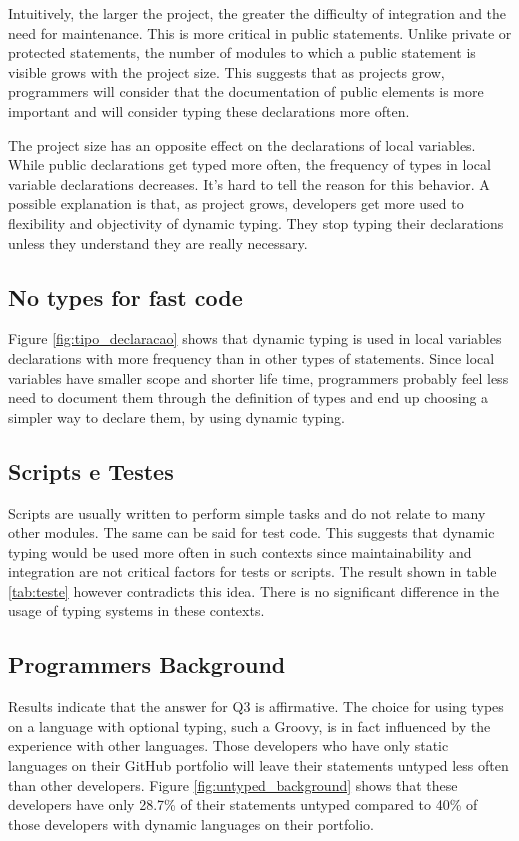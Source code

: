 \documentclass[preprint]{sigplanconf}
\begin{document}
Intuitively, the larger the project, the greater the difficulty of integration and the need for maintenance.
This is more critical in public statements.
Unlike private or protected statements, the number of modules to which a public statement is visible grows with the project size.
This suggests that as projects grow, programmers will consider that the documentation of public elements is more important and will consider typing these declarations more often.

The project size has an opposite effect on the declarations of local variables.
While public declarations get typed more often, the frequency of types in local variable declarations decreases.
It's hard to tell the reason for this behavior.
A possible explanation is that, as project grows, developers get more used to flexibility and objectivity of dynamic typing.
They stop typing their declarations unless they understand they are really necessary.

\subsection{No types for fast code}
Figure \ref{fig:tipo_declaracao} shows that dynamic typing is used in local variables declarations with more frequency than in other types of statements.
Since local variables have smaller scope and shorter life time, programmers probably feel less need to document them through the definition of types and end up choosing a simpler way to declare them, by using dynamic typing.

\subsection{Scripts e Testes\label{sub:Scripts-e-Testes}}
Scripts are usually written to perform simple tasks and do not relate to many other modules. 
The same can be said for test code. 
This suggests that dynamic typing would be used more often in such contexts since maintainability and integration are not critical factors for tests or scripts. 
The result shown in table \ref{tab:teste} however contradicts this idea.
There is no significant difference in the usage of typing systems in these contexts.

\subsection{Programmers Background}
Results indicate that the answer for Q3 is affirmative.
The choice for using types on a language with optional typing, such a Groovy, is in fact influenced by the experience  with other languages.
Those developers who have only static languages on their GitHub portfolio will leave their statements untyped less often than other developers.
Figure \ref{fig:untyped_background} shows that these developers have only 28.7\% of their statements untyped compared to 40\% of those developers with dynamic languages on their portfolio. 
\end{document}
